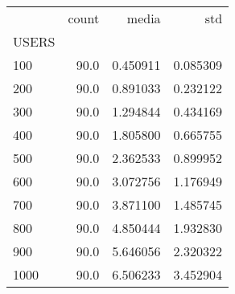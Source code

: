 \begin{tabular}{lrrr}
\toprule
{} &  count &     media &       std \\
USERS &        &           &           \\
\midrule
100   &   90.0 &  0.450911 &  0.085309 \\
200   &   90.0 &  0.891033 &  0.232122 \\
300   &   90.0 &  1.294844 &  0.434169 \\
400   &   90.0 &  1.805800 &  0.665755 \\
500   &   90.0 &  2.362533 &  0.899952 \\
600   &   90.0 &  3.072756 &  1.176949 \\
700   &   90.0 &  3.871100 &  1.485745 \\
800   &   90.0 &  4.850444 &  1.932830 \\
900   &   90.0 &  5.646056 &  2.320322 \\
1000  &   90.0 &  6.506233 &  3.452904 \\
\bottomrule
\end{tabular}
